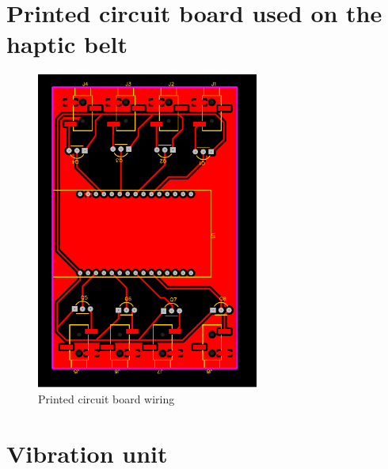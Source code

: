

\section{Printed circuit board used on the haptic belt}

    \begin{figure}[htbp]
        \centering
        \includegraphics[width=0.65\textwidth, angle = 90, origin = c]{Apend Cinto/PCB Cinto.pdf}
        \caption{Printed circuit board wiring}
        \label{pcb_wiring}
    \end{figure}
    
\pagebreak

\section{Vibration unit}

